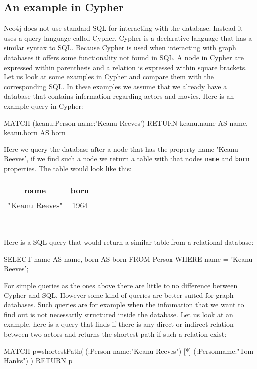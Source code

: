 \subsection{An example in Cypher}
Neo4j does not use standard SQL for interacting with the database. Instead it uses a query-language called Cypher. Cypher is a declarative language that has a similar syntax to SQL. Because Cypher is used when interacting with graph databases it offers some functionality not found in SQL. A node in Cypher are expressed within parenthesis and a relation is expressed within square brackets. Let us look at some examples in Cypher and compare them with the corresponding SQL. In these examples we assume that we already have a database that contains information regarding actors and movies. Here is an example query in Cypher:
\begin{sqlCode}
  MATCH (keanu:Person {name:'Keanu Reeves'})
  RETURN keanu.name AS name, keanu.born AS born
\end{sqlCode}
Here we query the database after a node that has the property name 'Keanu Reeves', if we find such a node we return a table with that nodes \texttt{name} and \texttt{born} properties. The table would look like this:
\begin{center}
  \begin{tabular}{|c|c|}
    \hline
    name           & born \\
    \hline
    "Keanu Reeves" & 1964 \\
    \hline
  \end{tabular}\\
\end{center}
Here is a SQL query that would return a similar table from a relational database:


\begin{sqlCode}
SELECT
  name AS name,
  born AS born
FROM
  Person
WHERE
  name = 'Keanu Reeves';
\end{sqlCode}

For simple queries as the ones above there are little to no difference between Cypher and SQL. However some kind of queries are better suited for graph databases. Such queries are for example when the information that we want to find out is not necessarily structured inside the database. Let us look at an example, here is a query that finds if there is any direct or indirect relation between two actors and returns the shortest path if such a relation exist:

\begin{sqlCode}
MATCH p=shortestPath(
(:Person {name:"Keanu Reeves"})-[*]-(:Person{name:"Tom Hanks"})
) RETURN p
\end{sqlCode}

